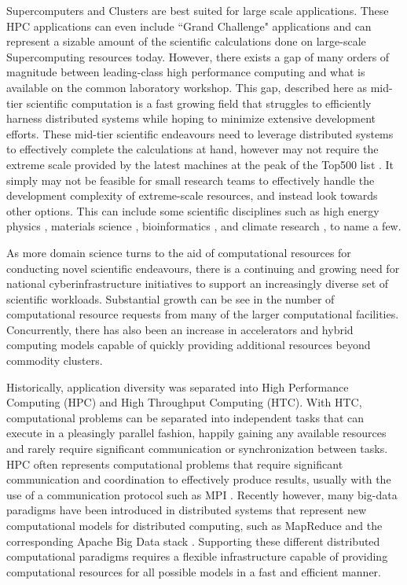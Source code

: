 Supercomputers and Clusters are best suited for large scale applications.  These HPC applications can even include ``Grand Challenge" applications \cite{hoare2005grand} and can represent a sizable amount of the scientific calculations done on large-scale Supercomputing resources today. However, there exists a gap of many orders of magnitude  between leading-class high performance computing and what is available on the common laboratory workshop. This gap, described here as mid-tier scientific computation is a fast growing field that struggles to efficiently harness distributed systems while hoping to minimize extensive development efforts. These mid-tier scientific endeavours need to leverage distributed systems to effectively complete the calculations at hand, however may not require the extreme scale provided by the latest machines at the peak of the Top500 list \cite{www-top500}. It simply may not be feasible for small research teams to effectively handle the development complexity of extreme-scale resources, and instead look towards other options.  This can include some scientific disciplines such as high energy physics \cite{buncic2010cernvm}, materials science \cite{wang2006survey}, bioinformatics \cite{menon2012cloud}, and climate research \cite{He2010nasa}, to name a few.  


As more domain science turns to the aid of computational resources for conducting novel scientific endeavours, there is a continuing and growing need for national cyberinfrastructure initiatives to support an increasingly diverse set of scientific workloads. Substantial growth can be see in the number of computational resource requests \cite{towns2014xsede, antypas2008nersc} from many of the larger computational facilities.  Concurrently, there has also been an increase in accelerators and hybrid computing models capable of quickly providing additional resources \cite{vetter2011keeneland} beyond commodity clusters.

Historically, application diversity was separated into High Performance Computing (HPC) and High Throughput Computing (HTC).  With HTC, computational problems can be separated into independent tasks that can execute in a pleasingly parallel fashion, happily gaining any available resources and rarely require significant communication or synchronization between tasks. HPC often represents computational problems that require significant communication and coordination to effectively produce results, usually with the use of a communication protocol such as MPI \cite{mpi}.  Recently however, many big-data paradigms \cite{agrawal2011big} have been introduced in distributed systems that represent new computational models for distributed computing, such as MapReduce \cite{dean2008mapreduce} and the corresponding Apache Big Data stack \cite{kamburugamuve2013survey, chen2014big}. Supporting these different distributed computational paradigms requires a flexible infrastructure capable of providing computational resources for all possible models in a fast and efficient manner.



